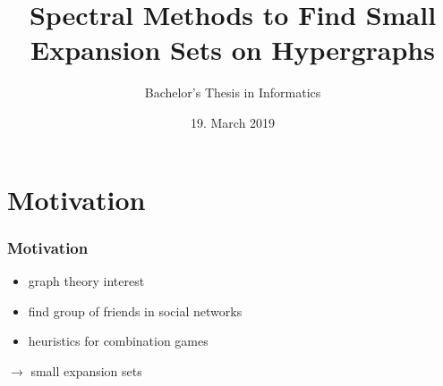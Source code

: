 \documentclass{beamer}
\title{Spectral Methods to Find Small Expansion	Sets on Hypergraphs}
\author{Bachelor's Thesis in Informatics}
\institute{	Franz Rieger\\Department of Informatics\\Technical University of Munich\\
	Supervisor: Prof. Dr. rer. nat. Susanne  Albers\\
	Advisor: Dr. T.-H. Hubert Chan\\
	Submission Date: 15. March 2019\\
}
\date{19. March 2019}
\begin{document}
	\maketitle
	
	\section{Motivation}
	\begin{frame} %
		\frametitle{Motivation} %
			\begin{itemize}
				\item graph theory interest
				\item find group of friends in social networks
				\item heuristics for combination games
			\end{itemize}
			
		$\to$ small expansion sets
	\end{frame}
	
\end{document}
